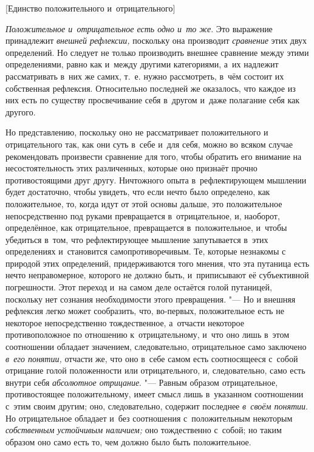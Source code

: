 %
  {[Единство положительного и~отрицательного]}

{\em Положительное и~отрицательное есть одно и~то же}.
Это выражение принадлежит {\em внешней рефлексии,}
поскольку она производит {\em сравнение} этих двух
определений. Но следует не только производить внешнее сравнение между этими
определениями, равно как и~между другими категориями, а~их надлежит
рассматривать в~них же самих, т.~е. нужно рассмотреть, в~чём состоит их
собственная рефлексия. Относительно последней же оказалось, что каждое из
них есть по существу просвечивание себя в~другом и~даже полагание себя как
другого.

Но представлению, поскольку оно не рассматривает положительного и
отрицательного так, как они суть в~себе и~для себя, можно во всяком случае
рекомендовать произвести сравнение для того, чтобы обратить его внимание на
несостоятельность этих различенных, которые оно признаёт прочно
противостоящими друг другу. Ничтожного опыта в~рефлектирующем мышлении
будет достаточно, чтобы увидеть, что если нечто было определено, как
положительное, то, когда идут от этой основы дальше, это положительное
непосредственно под руками превращается в~отрицательное, и, наоборот,
определённое, как отрицательное, превращается в~положительное, и~чтобы
убедиться в~том, что рефлектирующее мышление запутывается в~этих
определениях и~становится самопротиворечивым. Те, которые незнакомы с
природой этих определений, придерживаются того мнения, что эта путаница
есть нечто неправомерное, которого не должно быть, и~приписывают её
субъективной погрешности. Этот переход и~на самом деле остаётся голой
путаницей, поскольку нет сознания необходимости этого превращения. "--- Но и
внешняя рефлексия легко может сообразить, что, во-первых, положительное
есть не некоторое непосредственно тождественное, а~отчасти некоторое
противоположное по отношению к~отрицательному, и~что оно лишь в~этом
соотношении обладает значением, следовательно, отрицательное само заключено
{\em в~его понятии,} отчасти
же, что оно в~себе самом есть соотносящееся с~собой отрицание голой
положенности или отрицательного, и, следовательно, само есть внутри себя
{\em абсолютное отрицание}. "--- Равным образом
отрицательное, противостоящее положительному, имеет смысл лишь в~указанном
соотношении с~этим своим другим; оно, следовательно, содержит последнее
{\em в~своём понятии}. Но отрицательное обладает и~без
соотношения с~положительным некоторым {\em собственным
устойчивым наличием;} оно тождественно с~собой; но таким образом оно само
есть то, чем должно было быть положительное.

